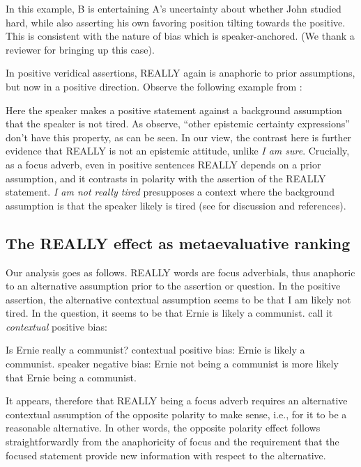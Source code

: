 \documentclass[output=paper,colorlinks,citecolor=brown]{langscibook}
\begin{document}
In this example, B is entertaining A's uncertainty about whether John studied hard, while also asserting his own favoring position tilting towards the positive. This is consistent with the nature of bias which is speaker-anchored. (We thank a reviewer for bringing up this case). 

 
 In positive veridical assertions, \textsc{REALLY} again is anaphoric to prior assumptions, but now in a positive direction. Observe the following example from \citet{romero2004}:


Here the speaker makes a positive statement against a background assumption that the speaker is not tired.  As \citet{romero2004} observe,  ``other epistemic certainty expressions'' don't have this property, as can be seen. In our view, the contrast here is further evidence that \textsc{REALLY} is not an epistemic attitude, unlike \textit{I am sure}. Crucially, as a focus adverb,  even in positive sentences \textsc{REALLY} depends on a prior assumption, and it  contrasts in polarity with the assertion of the \textsc{REALLY} statement.  \textit{I am not really tired} presupposes a context where the background assumption is that the speaker likely is tired (see \citealt{liu2021} for discussion and references). 

\subsection{The \textsc{REALLY} effect as metaevaluative ranking}

Our analysis goes as follows. \textsc{REALLY} words are focus adverbials, thus anaphoric to an alternative assumption prior to the assertion or question. In the positive assertion, the alternative contextual assumption seems to be that I am likely not tired. In the question, it seems to be that Ernie is likely a communist. \citet{liu2021} call it \textit{contextual} positive bias:


\ea Is Ernie really a communist?
     \ea contextual positive bias: Ernie is likely a communist.
      \ex speaker negative bias: Ernie not being a communist is more likely that Ernie being a communist.
\z
\z      
      
It appears, therefore that \textsc{REALLY} being a focus adverb requires an alternative contextual assumption of the opposite polarity to make sense, i.e., for it to be a reasonable alternative. In other words, the opposite polarity effect follows straightforwardly from  the anaphoricity of focus and the requirement that the focused statement provide new information with respect to the alternative. 
\end{document}
